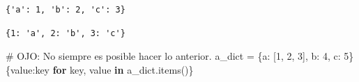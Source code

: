 \documentclass[
  spanish,
  letterpaper,
]{scrbook}
\newenvironment{Shaded}{\begin{snugshade}}{\end{snugshade}}
\newcommand{\CommentTok}[1]{\textcolor[rgb]{0.37,0.37,0.37}{#1}}
\newcommand{\ControlFlowTok}[1]{\textcolor[rgb]{0.00,0.23,0.31}{\textbf{#1}}}
\newcommand{\DecValTok}[1]{\textcolor[rgb]{0.68,0.00,0.00}{#1}}
\newcommand{\KeywordTok}[1]{\textcolor[rgb]{0.00,0.23,0.31}{\textbf{#1}}}
\newcommand{\NormalTok}[1]{\textcolor[rgb]{0.00,0.23,0.31}{#1}}
\newcommand{\OperatorTok}[1]{\textcolor[rgb]{0.37,0.37,0.37}{#1}}
\newcommand{\StringTok}[1]{\textcolor[rgb]{0.13,0.47,0.30}{#1}}
\theoremstyle{definition}
\theoremstyle{remark}
\begin{document}
\begin{verbatim}
{'a': 1, 'b': 2, 'c': 3}
\end{verbatim}

\begin{verbatim}
{1: 'a', 2: 'b', 3: 'c'}
\end{verbatim}

\begin{Shaded}
\begin{Highlighting}[]
\CommentTok{\# OJO: No siempre es posible hacer lo anterior.}
\NormalTok{a\_dict }\OperatorTok{=}\NormalTok{ \{}\StringTok{\textquotesingle{}a\textquotesingle{}}\NormalTok{: [}\DecValTok{1}\NormalTok{, }\DecValTok{2}\NormalTok{, }\DecValTok{3}\NormalTok{], }\StringTok{\textquotesingle{}b\textquotesingle{}}\NormalTok{: }\DecValTok{4}\NormalTok{, }\StringTok{\textquotesingle{}c\textquotesingle{}}\NormalTok{: }\DecValTok{5}\NormalTok{\}}
\NormalTok{\{value:key }\ControlFlowTok{for}\NormalTok{ key, value }\KeywordTok{in}\NormalTok{ a\_dict.items()\}}
\end{Highlighting}
\end{Shaded}
\end{document}
